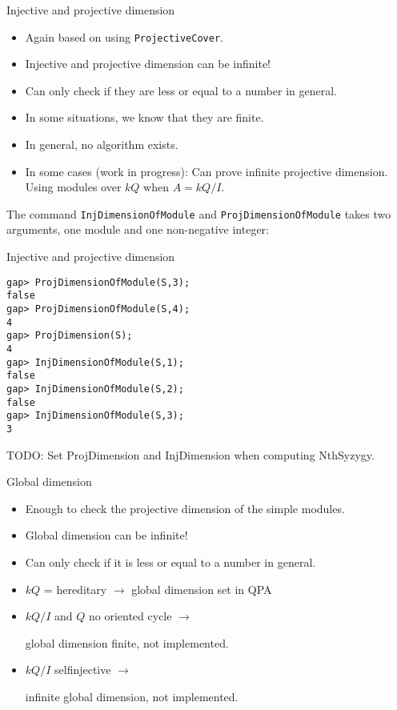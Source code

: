 \begin{frame}[fragile]{Injective and projective dimension}

\begin{itemize}
\item Again based on using \texttt{ProjectiveCover}.
\item Injective and projective dimension can be infinite!
\item Can only check if they are less or equal to a number in general.
\item In some situations, we know that they are finite.
\item In general, no algorithm exists.
\item In some cases (work in progress): Can prove infinite projective
dimension.  Using modules over $kQ$ when $A = kQ/I$.  
\end{itemize} 

The command \texttt{InjDimensionOfModule} and
\texttt{ProjDimensionOfModule} takes two arguments, one module and one
non-negative integer:
\end{frame}

\begin{frame}[fragile]{Injective and projective dimension}

\begin{verbatim}
gap> ProjDimensionOfModule(S,3);
false
gap> ProjDimensionOfModule(S,4);
4
gap> ProjDimension(S);
4
gap> InjDimensionOfModule(S,1); 
false
gap> InjDimensionOfModule(S,2);
false
gap> InjDimensionOfModule(S,3);
3
\end{verbatim}
TODO: Set ProjDimension and InjDimension when computing NthSyzygy. 
\end{frame}

\begin{frame}[fragile]{Global dimension}
\begin{itemize}
\item Enough to check the projective dimension of the simple modules.
\item Global dimension can be infinite!
\item Can only check if it is less or equal to a number in general.
\item $kQ$ = hereditary $\longrightarrow$ global dimension set in QPA
\item $kQ/I$ and $Q$ no oriented cycle $\longrightarrow$ \parbox[t]{4cm}{global dimension finite, not
implemented.}
\item $kQ/I$ selfinjective $\longrightarrow$ \parbox[t]{6cm}{infinite global dimension, not implemented.}
\end{itemize}
\end{frame}

